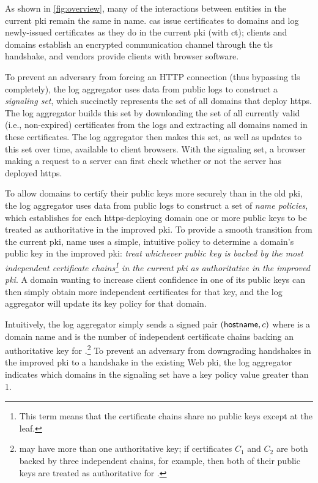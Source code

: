 As shown in \autoref{fig:overview}, many of the interactions between entities in
the current \ac{pki} remain the same in \ac{name}. \acp{ca} issue certificates
to domains and log newly-issued certificates as they do in the current \ac{pki}
(with \ac{ct}); clients and domains establish an encrypted communication channel
through the \ac{tls} handshake, and vendors provide clients with browser
software.

To prevent an adversary from forcing an HTTP connection (thus bypassing \ac{tls}
completely), the log aggregator uses data from public logs to construct a
\emph{signaling set}, which succinctly represents the set of all domains that
deploy \ac{https}. The log aggregator builds this set by downloading the set of
all currently valid (i.e., non-expired) certificates from the logs and
extracting all domains named in these certificates. The log aggregator then
makes this set, as well as updates to this set over time, available to client
browsers. With the signaling set, a browser making a request to a server can
first check whether or not the server has deployed \ac{https}.

To allow domains to certify their public keys more securely than in the old
\ac{pki}, the log aggregator uses data from public logs to construct a set of
\emph{\ac{name} policies}, which establishes for each \ac{https}-deploying
domain one or more public keys to be treated as authoritative in the improved
\ac{pki}. To provide a smooth transition from the current \ac{pki}, \ac{name}
uses a simple, intuitive policy to determine a domain's public key in the
improved \ac{pki}: \emph{treat whichever public key is backed by the most
  independent certificate chains\footnote{This term means that the certificate
chains share no public keys except at the leaf.} in the current \ac{pki} as
authoritative in the improved \ac{pki}}. A domain wanting to increase client
confidence in one of its public keys can then simply obtain more independent
certificates for that key, and the log aggregator will update its key policy for
that domain.

Intuitively, the log aggregator simply sends a signed pair $(\textsf{hostname},
c)$ where \hostname is a domain name and \policy is the number of
independent certificate chains backing an authoritative key for
\hostname.\footnote{\hostname may have more than one authoritative key; if
certificates $C_1$ and $C_2$ are both backed by three independent chains, for
example, then both of their public keys are treated as authoritative for
\hostname.} To prevent an adversary from downgrading handshakes in the improved
\ac{pki} to a handshake in the existing Web \ac{pki}, the log aggregator
indicates which domains in the signaling set have a key policy value greater
than 1.

